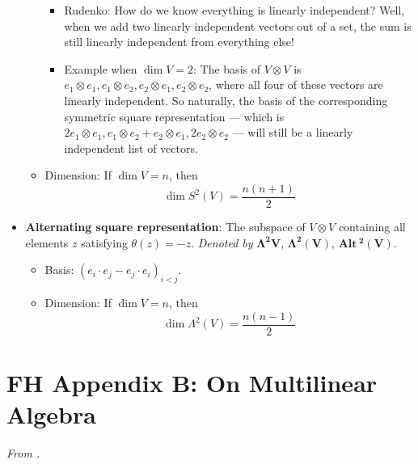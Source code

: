 \documentclass[../notes.tex]{subfiles}
\begin{document}
\begin{itemize}
\begin{itemize}
\begin{itemize}
            \item Rudenko: How do we know everything is linearly independent? Well, when we add two linearly independent vectors out of a set, the sum is still linearly independent from everything else!
            \item Example when $\dim V=2$: The basis of $V\otimes V$ is $e_1\otimes e_1,e_1\otimes e_2,e_2\otimes e_1,e_2\otimes e_2$, where all four of these vectors are linearly independent. So naturally, the basis of the corresponding symmetric square representation --- which is $2e_1\otimes e_1,e_1\otimes e_2+e_2\otimes e_1,2e_2\otimes e_2$ --- will still be a linearly independent list of vectors.
        \end{itemize}
        \item Dimension: If $\dim V=n$, then
        \begin{equation*}
            \dim S^2(V) = \frac{n(n+1)}{2}
        \end{equation*}
    \end{itemize}
    \item \textbf{Alternating square representation}: The subspace of $V\otimes V$ containing all elements $z$ satisfying $\theta(z)=-z$. \emph{Denoted by} $\bm{\Lambda^2V}$, $\bm{\Lambda^2(V)}$, $\pmb{\textbf{Alt}}\,\bm{{}^2(V)}$.
    \begin{itemize}
        \item Basis: $(e_i\cdot e_j-e_j\cdot e_i)_{i<j}$.
        \item Dimension: If $\dim V=n$, then
        \begin{equation*}
            \dim\Lambda^2(V) = \frac{n(n-1)}{2}
        \end{equation*}
    \end{itemize}
\end{itemize}



\section{FH Appendix B: On Multilinear Algebra}
\emph{From \textcite{bib:FultonHarris}.}
\end{document}
